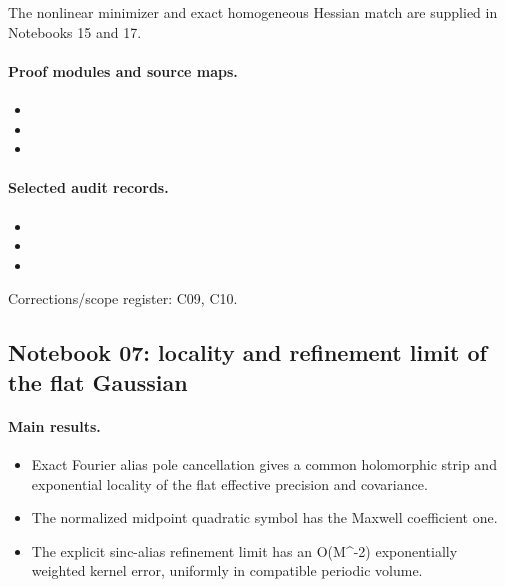 The nonlinear minimizer and exact homogeneous Hessian match are supplied in Notebooks 15 and 17.

\paragraph{Proof modules and source maps.}
\begingroup\small
\begin{itemize}
\item {}
\item {}
\item {}
\end{itemize}
\endgroup

\paragraph{Selected audit records.}
\begingroup\small
\begin{itemize}
\item {}
\item {}
\item {}
\end{itemize}
\endgroup
Corrections/scope register: C09, C10.\par

\subsection{Notebook 07: locality and refinement limit of the flat Gaussian}
\label{hnc-07}
\noindent{}\par

\paragraph{Main results.}
\begin{itemize}
\item Exact Fourier alias pole cancellation gives a common holomorphic strip and exponential locality of the flat effective precision and covariance.
\item The normalized midpoint quadratic symbol has the Maxwell coefficient one.
\item The explicit sinc-alias refinement limit has an O(M\textasciicircum{}-2) exponentially weighted kernel error, uniformly in compatible periodic volume.
\end{itemize}

